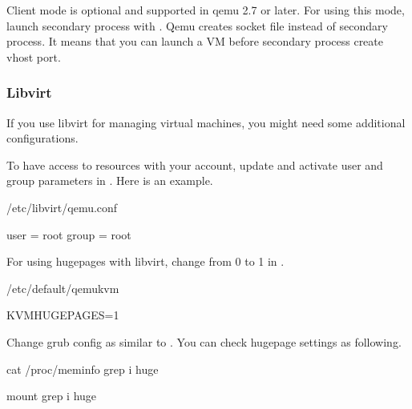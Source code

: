 \documentclass[a4paper,11pt,openany,oneside,english]{sphinxmanual}
\begin{document}
Client mode is optional and supported in qemu 2.7 or later.
For using this mode, launch secondary process with .
Qemu creates socket file instead of secondary process.
It means that you can launch a VM before secondary process create vhost port.


\subsubsection{Libvirt}
\label{\detokenize{gsg/setup:libvirt}}
If you use libvirt for managing virtual machines, you might need some
additional configurations.

To have access to resources with your account, update and
activate user and group parameters in .
Here is an example.

\begin{sphinxVerbatim}[commandchars=\\\{\},formatcom=\footnotesize]
\PYGZsh{} /etc/libvirt/qemu.conf

user = \PYGZdq{}root\PYGZdq{}
group = \PYGZdq{}root\PYGZdq{}
\end{sphinxVerbatim}

For using hugepages with libvirt, change  from 0 to 1
in .

\begin{sphinxVerbatim}[commandchars=\\\{\},formatcom=\footnotesize]
\PYGZsh{} /etc/default/qemu\PYGZhy{}kvm

KVM\PYGZus{}HUGEPAGES=1
\end{sphinxVerbatim}

Change grub config as similar to
{\hyperref[\detokenize{gsg/setup:gsg-reserve-hugep}]{}}.
You can check hugepage settings as following.

\begin{sphinxVerbatim}[commandchars=\\\{\},formatcom=\footnotesize]
 cat /proc/meminfo  grep \PYGZhy{}i huge

 mount  grep \PYGZhy{}i huge
\end{sphinxVerbatim}
\end{document}
